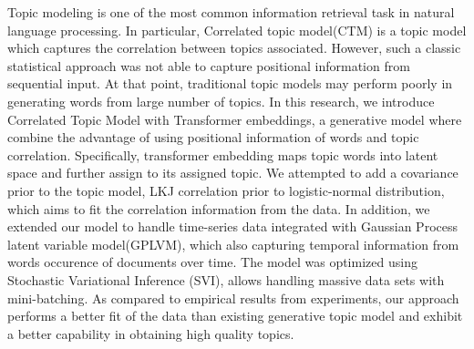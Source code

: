 \documentclass[master,abst,11pt]{iscs-thesis}
\date{\today}
\begin{document}
\begin{eabstract}
Topic modeling is one of the most common information retrieval task in natural language processing. In particular, Correlated topic model(CTM) is a topic model which captures the correlation between topics associated. However, such a classic statistical approach was not able to capture positional information from sequential input. At that point, traditional topic models may perform poorly in generating words from large number of topics. 
In this research, we introduce Correlated Topic Model with Transformer embeddings, a generative model where combine the advantage of using positional information of words and topic correlation. Specifically, transformer embedding maps topic words into latent space and further assign to its assigned topic. 
We attempted to add a covariance prior to the topic model, LKJ correlation prior to logistic-normal distribution, which aims to fit the correlation information from the data. 
In addition, we extended our model to handle time-series data integrated with Gaussian Process latent variable model(GPLVM), which also capturing temporal information from words occurence of documents over time.
The model was optimized using Stochastic Variational Inference (SVI), allows handling massive data sets with mini-batching.
As compared to empirical results from experiments, our approach performs a better fit of the data than existing generative topic model and exhibit a better capability in obtaining high quality topics.
\end{eabstract}
\maketitle
\end{document}
